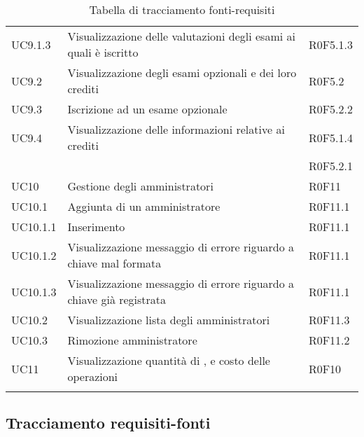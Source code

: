 \documentclass[AnalisiDeiRequisiti.tex]{subfiles}
\begin{document}
\begin{longtable}[H]{p{2cm}p{5cm}p{5cm}}
	UC9.1.3 & Visualizzazione delle valutazioni degli esami ai quali è iscritto	& R0F5.1.3 \\  
	UC9.2 & Visualizzazione degli esami opzionali e dei loro crediti & R0F5.2 \\  
	UC9.3 & Iscrizione ad un esame opzionale & R0F5.2.2 \\  
	UC9.4 & Visualizzazione delle informazioni relative ai crediti & R0F5.1.4 \\ 
	& & R0F5.2.1 \\  
	UC10 & Gestione degli amministratori & R0F11 \\  
	UC10.1 & Aggiunta di un amministratore & R0F11.1 \\  
	UC10.1.1 & Inserimento \citGloss{chiave pubblica} & R0F11.1 \\  
	UC10.1.2 & Visualizzazione messaggio di errore riguardo a chiave mal formata & R0F11.1 \\  
	UC10.1.3 & Visualizzazione messaggio di errore riguardo a chiave già registrata & R0F11.1 \\  
	UC10.2 & Visualizzazione lista degli amministratori & R0F11.3 \\  
	UC10.3 & Rimozione amministratore & R0F11.2 \\  
	UC11 & Visualizzazione quantità di \citGloss{Gas}, \citGloss{Ether} e costo delle operazioni & R0F10 \\  
	\hiderowcolors
	\caption{Tabella di tracciamento fonti-requisiti}
\end{longtable}

\subsection{Tracciamento requisiti-fonti}
\end{document}
